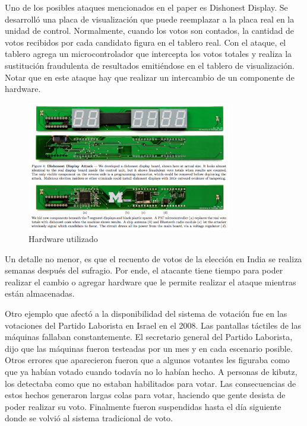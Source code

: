 Uno de los posibles ataques mencionados en el paper es Dishonest Display. Se desarrolló una placa de visualización que puede reemplazar a la placa real en la unidad de control. Normalmente, cuando los votos son contados, la cantidad de votos recibidos por cada candidato figura en el tablero real. Con el ataque, el tablero agrega un microcontrolador que intercepta los votos totales y realiza la sustitución fraudulenta de resultados emitiéndose en el tablero de visualización. Notar que en este ataque hay que realizar un intercambio de un componente de hardware.

\begin{figure}[H]
  \centering
  \includegraphics[width=0.8\textwidth]{Imagenes/almacenamiento2}
  \caption{Hardware utilizado}
\end{figure}

Un detalle no menor, es que el recuento de votos de la elección en India se realiza semanas después del sufragio. Por ende, el atacante tiene tiempo para poder realizar el cambio o agregar hardware que le permite realizar el ataque mientras están almacenadas.

Otro ejemplo que afectó a la disponibilidad del sistema de votación fue en las votaciones del Partido Laborista en Israel en el 2008. Las pantallas táctiles de las máquinas fallaban constantemente. El secretario general del Partido Laborista, dijo que las máquinas fueron testeadas por un mes y en cada escenario posible. Otros errores que aparecieron fueron que a algunos votantes les figuraba como que ya habían votado cuando todavía no lo habían hecho. A personas de kibutz, los detectaba como que no estaban habilitados para votar. \cite{haaretz2}
Las consecuencias de estos hechos generaron largas colas para votar, haciendo que gente desista de poder realizar su voto. Finalmente fueron suspendidas hasta el día siguiente donde se volvió al sistema tradicional de voto.
